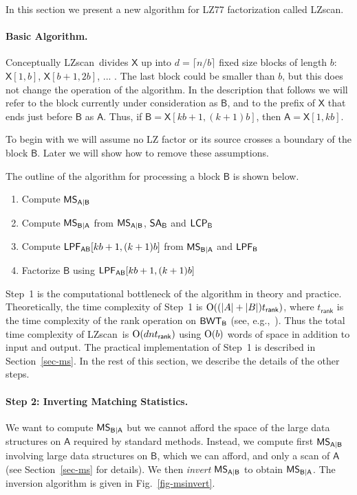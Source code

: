 \documentclass[runningheads]{llncs}
\def\BWT{\mbox{\rm L}}
\def\SA{\mbox{\rm {\sf SA}}}
\def\rank{\textsf{rank}}
\def\X{\textsf{X}}
\def\MS{\mbox{\rm {\sf MS}}}
\def\B{\textsf{B}}
\def\A{\textsf{A}}
\def\BWT{\mbox{\rm {\sf BWT}}}
\def\LCP{\mbox{\rm {\sf LCP}}}
\def\LPF{\mbox{\rm {\sf LPF}}}
\def\LZSCAN{\mbox{\sf LZscan}}
\def\O{\mbox{\rm O}}
\begin{document}
In this section we present a new algorithm for LZ77 factorization
called \LZSCAN.

\paragraph{Basic Algorithm.}

Conceptually \LZSCAN\ divides $\X$ up into $d=\lceil n/b \rceil$ fixed size
blocks of length $b$: $\X[1,b]$, $\X[b+1,2b]$, ... . The last
block could be smaller than $b$, but this does not change the
operation of the algorithm.  In the description that follows we will
refer to the block currently under consideration as $\B$, and to the
prefix of $\X$ that ends just before $\B$ as $\A$. Thus, if $\B =
\X[kb+1,(k+1)b]$, then $\A = \X[1,kb]$.  

To begin with we will assume no LZ factor or its source
crosses a boundary of the block $\B$. Later we will show how to remove
these assumptions.

The outline of the algorithm for processing a block $\B$ is shown below.
\begin{enumerate}
\item Compute $\MS_{\A|\B}$
\item Compute $\MS_{\B|\A}$ from $\MS_{\A|\B}$, $\SA_{\B}$ and $\LCP_{\B}$
\item Compute $\LPF_{\A\B}[kb+1,(k+1)b]$ from $\MS_{\B|\A}$ and
  $\LPF_{\B}$
\item Factorize $\B$ using $\LPF_{\A\B}[kb+1,(k+1)b]$
\end{enumerate}
Step~1 is the computational bottleneck of the algorithm in theory and
practice. Theoretically, the time complexity of Step~1 is
$\O((|A|+|B|)t_{\rank})$, where $t_{\rank}$ is the time complexity of
the rank operation on $\BWT_{\B}$ (see, e.g.,~\cite{bgnn2010}). 
Thus the total time complexity of
\LZSCAN\ is $\O(dnt_{\rank})$ using $\O(b)$ words of space in
addition to input and output. 
The practical implementation of Step~1 is described
in
Section~\ref{sec-ms}. In the rest of this section,
we describe the details of the other steps.

\paragraph{Step 2: Inverting Matching Statistics.}

We want to compute $\MS_{\B|\A}$ but we cannot afford the space of
the large data structures on $\A$ required by standard methods.
Instead, we compute first $\MS_{\A|\B}$ involving large data
structures on $\B$, which we can afford, and only a scan of $\A$ (see
Section~\ref{sec-ms} for details). We then \emph{invert} $\MS_{\A|\B}$ to
obtain $\MS_{\B|\A}$.
The inversion algorithm is given in Fig.~\ref{fig-msinvert}.
\end{document}

